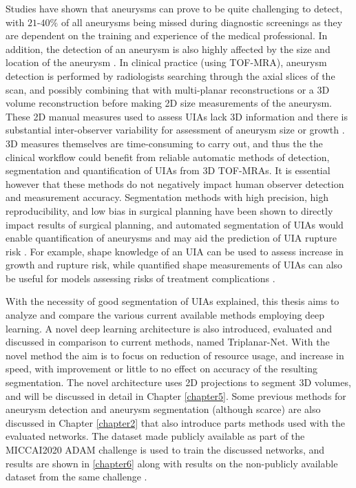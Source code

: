 Studies have shown that aneurysms can prove to be quite challenging to detect, with $21$-$40\%$ of all aneurysms being missed during diagnostic screenings as they are dependent on the training and experience of the medical professional. In addition, the detection of an aneurysm is also highly affected by the size and location of the aneurysm \cite{okahara2002diagnostic}. In clinical practice (using TOF-MRA), aneurysm detection is performed by radiologists searching through the axial slices of the scan, and possibly combining that with multi-planar reconstructions or a 3D volume reconstruction before making 2D size measurements of the aneurysm. These 2D manual measures used to assess UIAs lack 3D information and there is substantial inter-observer variability for assessment of aneurysm size or growth \citeauthor{White2001}. 3D measures themselves are time-consuming to carry out, and thus the the clinical workflow could benefit from reliable automatic methods of detection, segmentation and quantification of UIAs from 3D TOF-MRAs. It is essential however that these methods do not negatively impact human observer detection and measurement accuracy. Segmentation methods with high precision, high reproducibility, and low bias in surgical planning have been shown to directly impact results of surgical planning, and automated segmentation of UIAs would enable quantification of aneurysms and may aid the prediction of UIA rupture risk \cite{Taha2015}. For example, shape knowledge of an UIA can be used to assess increase in growth and rupture risk, while quantified shape measurements of UIAs can also be useful for models assessing risks of treatment complications \cite{backes2017elapss, ji2016risk}.

With the necessity of good segmentation of UIAs explained, this thesis aims to analyze and compare the various current available methods employing deep learning. A novel deep learning architecture is also introduced, evaluated and discussed in comparison to current methods, named Triplanar-Net. With the novel method the aim is to focus on reduction of resource usage, and increase in speed, with improvement or little to no effect on accuracy of the resulting segmentation. The novel architecture uses 2D projections to segment 3D volumes, and will be discussed in detail in Chapter \ref{chapter5}. Some previous methods for aneurysm detection and aneurysm segmentation (although scarce) are also discussed in Chapter \ref{chapter2} that also introduce parts methods used with the evaluated networks. The dataset made publicly available as part of the MICCAI2020 ADAM challenge is used to train the discussed networks, and results are shown in \ref{chapter6} along with results on the non-publicly available dataset from the same challenge \cite{Timmins2020}. 

